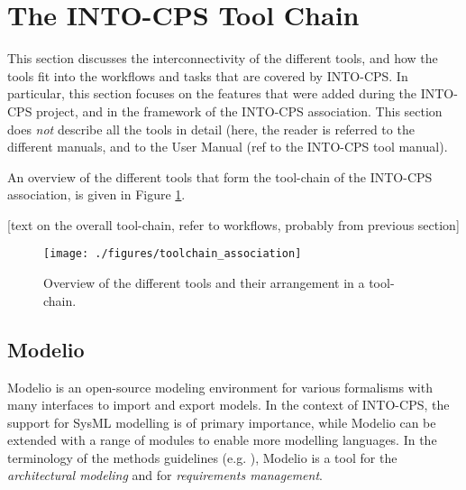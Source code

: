 
\section{The INTO-CPS Tool Chain}\label{sec:toolchain}




This section discusses the interconnectivity of the different tools, and how the tools fit into the workflows and tasks that are covered by INTO-CPS. In particular, this section focuses on the features that were added during the INTO-CPS project, and in the framework of the INTO-CPS association. This section does \textit{not} describe all the tools in detail (here, the reader is referred to the different manuals, and to the User Manual (ref to the INTO-CPS tool manual).

An overview of the different tools that form the tool-chain of the INTO-CPS association, is given in Figure \ref{fig:tool-chain}.

[text on the overall tool-chain, refer to workflows, probably from previous section]

\begin{figure}[!ht]
	\centering
		\texttt{[image: ./figures/toolchain\_association]}
	\caption{Overview of the different tools and their arrangement in a tool-chain.}
	\label{fig:tool-chain}
\end{figure}

\subsection{Modelio}

Modelio is an open-source modeling environment for various formalisms with many interfaces to import and export models. In the context of INTO-CPS, the support for SysML modelling is of primary importance, while Modelio can be extended with a range of modules to enable more modelling languages. In the terminology of the methods guidelines (e.g. \cite{INTOCPSD3.3a}), Modelio is a tool for the \textit{architectural modeling} and for \textit{requirements management}.

